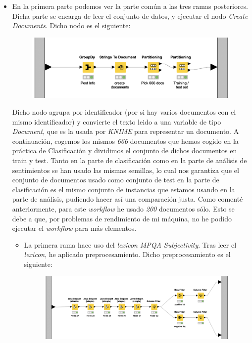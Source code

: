 \documentclass[11pt]{article}
\begin{document}
\begin{itemize}
	\item En la primera parte podemos ver la parte común a las tres ramas posteriores. Dicha parte se encarga de leer el conjunto de datos, y ejecutar el nodo \textit{Create Documents}. Dicho nodo es el siguiente:
	
	\begin{figure}[H]
		\centering
		\includegraphics[width=0.5\linewidth]{images/create_documents.png}
	\end{figure}
	
	Dicho nodo agrupa por identificador (por si hay varios documentos con el mismo identificador) y convierte el texto leido a una variable de tipo \textit{Document}, que es la usada por \textit{KNIME} para representar un documento. A continuación, cogemos los mismos \textit{666} documentos que hemos cogido en la práctica de Clasificación y dividimos el conjunto de dichos documentos en train y test. Tanto en la parte de clasificación como en la parte de análisis de sentimientos se han usado las mismas semillas, lo cual nos garantiza que el conjunto de documentos usado como conjunto de test en la parte de clasificación es el mismo conjunto de instancias que estamos usando en la parte de análisis, pudiendo hacer así una comparación justa. Como comenté anteriormente, para este \textit{workflow} he usado \textit{200} documentos sólo. Esto se debe a que, por problemas de rendimiento de mi máquina, no he podido ejecutar el \textit{workflow} para más elementos.
	
	\begin{itemize}
		\item La primera rama hace uso del \textit{lexicon} \textit{MPQA Subjectivity}. Tras leer el \textit{lexicon}, he aplicado preprocesamiento. Dicho preprocesamiento es el siguiente:
		
		\begin{figure}[H]
			\centering
			\includegraphics[width=0.8\linewidth]{images/MPQA_preprocessing.png}
		\end{figure}
		

\end{itemize}
\end{itemize}
\end{document}
